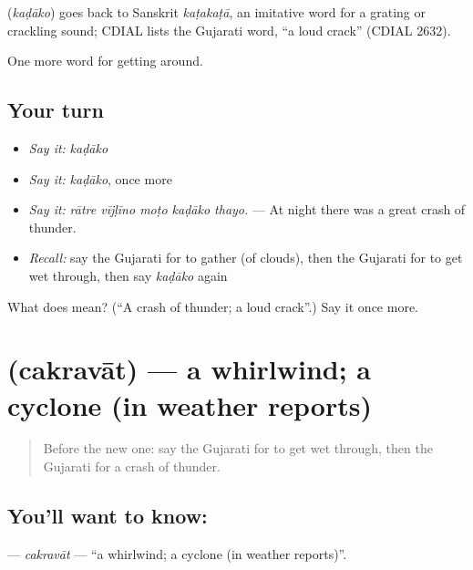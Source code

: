 \begin{cousinweb}
\textbf{} (\emph{kaḍāko}) goes back to Sanskrit \emph{kaṭakaṭā}, an imitative word for a grating or crackling sound; CDIAL lists the Gujarati word, \textquotedblleft{}a loud crack\textquotedblright{} (CDIAL 2632).
\end{cousinweb}

\begin{grammarlens}[title={What you've built}]
One more word for getting around.
\end{grammarlens}

\subsection*{Your turn}
\begin{itemize}
\raggedright
  \item \emph{Say it:} \emph{kaḍāko}
  \item \emph{Say it:} \emph{kaḍāko}, once more
  \item \emph{Say it:} \emph{rātre vījḷīno moṭo kaḍāko thayo.} — At night there was a great crash of thunder.
  \item \emph{Recall:} say the Gujarati for to gather (of clouds), then the Gujarati for to get wet through, then say \emph{kaḍāko} again
\end{itemize}

\begin{tcolorbox}[breakable,colback=teal!4,colframe=teal!35!black,title={Before you move on}]
What does  mean? (\textquotedblleft{}A crash of thunder; a loud crack\textquotedblright{}.) Say it once more.
\end{tcolorbox}
\section[\texorpdfstring{\gu{ચક્રવાત} (cakravāt)}{ચક્રવાત (cakravāt)}]{ (cakravāt) — a whirlwind; a cyclone (in weather reports)}

\label{lesson:GU-C435-cakravat}



\begin{quote}
Before the new one: say the Gujarati for to get wet through, then the Gujarati for a crash of thunder.
\end{quote}

\subsection*{You'll want to know: }
\textbf{} — \emph{cakravāt} — \textquotedblleft{}a whirlwind; a cyclone (in weather reports)\textquotedblright{}.

